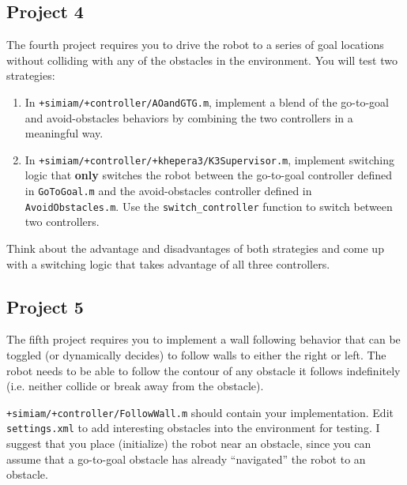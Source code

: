 \documentclass[10pt]{article}
\begin{document}
\subsection*{Project 4}
The fourth project requires you to drive the robot to a series of goal locations without colliding with any of the obstacles in the environment. You will test two strategies:
\begin{enumerate}
  \item In \texttt{+simiam/+controller/AOandGTG.m}, implement a blend of the go-to-goal and avoid-obstacles behaviors by combining the two controllers in a meaningful way.
  \item In \texttt{+simiam/+controller/+khepera3/K3Supervisor.m}, implement switching logic that \textbf{only} switches the robot between the go-to-goal controller defined in \texttt{GoToGoal.m} and the avoid-obstacles controller defined in \texttt{AvoidObstacles.m}. Use the \texttt{switch\_controller} function to switch between two controllers.
\end{enumerate}

Think about the advantage and disadvantages of both strategies and come up with a switching logic that takes advantage of all three controllers.

\subsection*{Project 5}
The fifth project requires you to implement a wall following behavior that can be toggled (or dynamically decides) to follow walls to either the right or left. The robot needs to be able to follow the contour of any obstacle it follows indefinitely (i.e. neither collide or break away from the obstacle).

\texttt{+simiam/+controller/FollowWall.m} should contain your implementation. Edit \texttt{settings.xml} to add interesting obstacles into the environment for testing. I suggest that you place (initialize) the robot near an obstacle, since you can assume that a go-to-goal obstacle has already ``navigated'' the robot to an obstacle.
\end{document}
